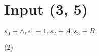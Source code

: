 \documentclass{article} %
\begin{document}
    \section{Input (3, 5)}
    $s_0 \equiv \land, s_1 \equiv 1, s_2 \equiv A, s_3 \equiv B$\\
        \begin{center}
            \begin{varwidth}{\textwidth}
            \begin{tasks}[label={(\roman*)},label-width={1cm}] (2)
                \task

                \task

            \end{tasks}
            \end{varwidth}
        \end{center}
\end{document}
